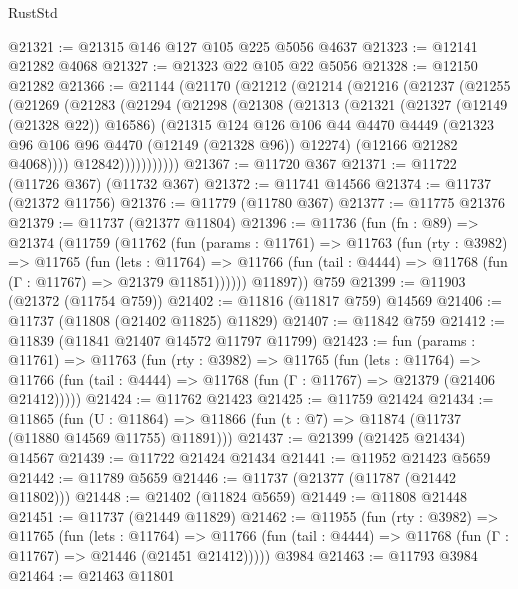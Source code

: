 \begin{lexlean}{RustStd}
\begin{coremodule}
@21321 := @21315 @146 @127 @105 @225 @5056 @4637
@21323 := @12141 @21282 @4068
@21327 := @21323 @22 @105 @22 @5056
@21328 := @12150 @21282
@21366 := @21144
    (@21170
      (@21212
        (@21214
          (@21216
            (@21237
              (@21255
                (@21269
                  (@21283
                    (@21294
                      (@21298
                        (@21308
                          (@21313
                            (@21321
                              (@21327 (@12149 (@21328 @22)) @16586)
                              (@21315
                                @124
                                @126
                                @106
                                @44
                                @4470
                                @4449
                                (@21323 @96 @106 @96 @4470 (@12149 (@21328 @96)) @12274)
                                (@12166 @21282 @4068))))
                          @12842)))))))))))
@21367 := @11720 @367
@21371 := @11722 (@11726 @367) (@11732 @367)
@21372 := @11741 @14566
@21374 := @11737 (@21372 @11756)
@21376 := @11779 (@11780 @367)
@21377 := @11775 @21376
@21379 := @11737 (@21377 @11804)
@21396 := @11736
    (fun (fn : @89) =>
    @21374
      (@11759
        (@11762
          (fun (params : @11761) =>
          @11763
            (fun (rty : @3982) =>
            @11765
              (fun (lets : @11764) =>
              @11766 (fun (tail : @4444) => @11768 (fun (Γ : @11767) => @21379 @11851))))))
        @11897))
    @759
@21399 := @11903 (@21372 (@11754 @759))
@21402 := @11816 (@11817 @759) @14569
@21406 := @11737 (@11808 (@21402 @11825) @11829)
@21407 := @11842 @759
@21412 := @11839 (@11841 @21407 @14572 @11797 @11799)
@21423 := fun (params : @11761) =>
  @11763
    (fun (rty : @3982) =>
    @11765
      (fun (lets : @11764) =>
      @11766 (fun (tail : @4444) => @11768 (fun (Γ : @11767) => @21379 (@21406 @21412)))))
@21424 := @11762 @21423
@21425 := @11759 @21424
@21434 := @11865
    (fun (U : @11864) => @11866 (fun (t : @7) => @11874 (@11737 (@11880 @14569 @11755) @11891)))
@21437 := @21399 (@21425 @21434) @14567
@21439 := @11722 @21424 @21434
@21441 := @11952 @21423 @5659
@21442 := @11789 @5659
@21446 := @11737 (@21377 (@11787 (@21442 @11802)))
@21448 := @21402 (@11824 @5659)
@21449 := @11808 @21448
@21451 := @11737 (@21449 @11829)
@21462 := @11955
    (fun (rty : @3982) =>
    @11765
      (fun (lets : @11764) =>
      @11766 (fun (tail : @4444) => @11768 (fun (Γ : @11767) => @21446 (@21451 @21412)))))
    @3984
@21463 := @11793 @3984
@21464 := @21463 @11801

\end{coremodule}
\end{lexlean}
